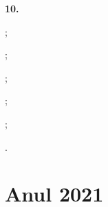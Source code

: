 \documentclass[11pt, a4paper]{article}
\begin{document}
\vspace{0.5cm}

\textbf{10.}\newline

\begin{inparaenum}
    \item ;
    \item ;
    \item ;
    \item ;
    \item ;
    \item .
\end{inparaenum}


\section{Anul 2021}

\end{document}
